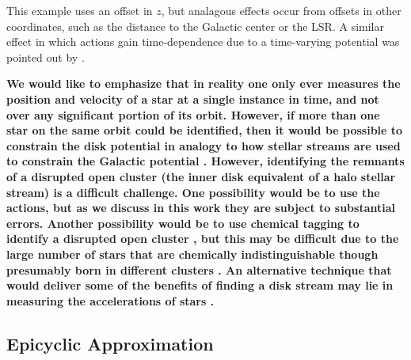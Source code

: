\documentclass[twocolumn]{aastex62}
\begin{document}
This example uses an offset in $z$, but analagous effects occur from offsets
in other coordinates, such as the distance to the Galactic center or the LSR.
A similar effect in which actions gain time-dependence due to a time-varying
potential was pointed out by \citet{2015A&A...584A.120B}.

\textbf{We would like to emphasize that in reality one only ever measures the
position and velocity of a star at a single instance in time, and not over any
significant portion of its orbit. However, if more than one star on the same
orbit
     could be identified, then it would be possible
to constrain the disk potential in analogy to how stellar streams are
used to constrain the Galactic  potential
\citep[e.g.][]{1999ApJ...512L.109J, 2001ApJ...551..294I, 
2004ApJ...610L..97H, 2015ApJ...801...98S, 2015ApJ...803...80K,
2019MNRAS.483.1427L}. However, identifying the remnants of a disrupted open
cluster (the inner disk equivalent of a halo stellar stream) is a difficult
challenge. One
    possibility would be to use the actions, but as we discuss in this
    work they are subject to substantial errors.  Another possibility would
    be to use
chemical tagging to identify a disrupted open cluster \citep{2002ARA&A..40..487F}, but
    this
may be difficult due to the large number of stars that are chemically
indistinguishable
    though
presumably born in different clusters
\citep{2018ApJ...853..198N}. An alternative technique that would deliver some
of the benefits of finding a disk stream may lie in measuring the
accelerations of stars \citep{2018arXiv181207581S}.}


\subsection{Epicyclic Approximation} \label{ssec:epi_action}
\end{document}
